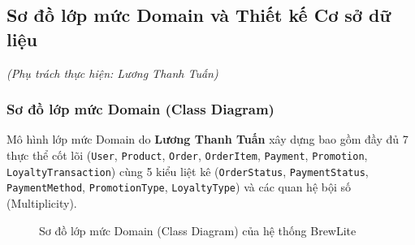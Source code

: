 \clearpage
\subsection{Sơ đồ lớp mức Domain và Thiết kế Cơ sở dữ liệu}
\textit{(Phụ trách thực hiện: Lương Thanh Tuấn)}

\subsubsection{Sơ đồ lớp mức Domain (Class Diagram)}
Mô hình lớp mức Domain do \textbf{Lương Thanh Tuấn} xây dựng bao gồm đầy đủ 7 thực thể cốt lõi (\texttt{User}, \texttt{Product}, \texttt{Order}, \texttt{OrderItem}, \texttt{Payment}, \texttt{Promotion}, \texttt{LoyaltyTransaction}) cùng 5 kiểu liệt kê (\texttt{OrderStatus}, \texttt{PaymentStatus}, \texttt{PaymentMethod}, \texttt{PromotionType}, \texttt{LoyaltyType}) và các quan hệ bội số (Multiplicity).

\begin{figure}[H]
\centering
{}
\caption{Sơ đồ lớp mức Domain (Class Diagram) của hệ thống BrewLite}
\end{figure}

